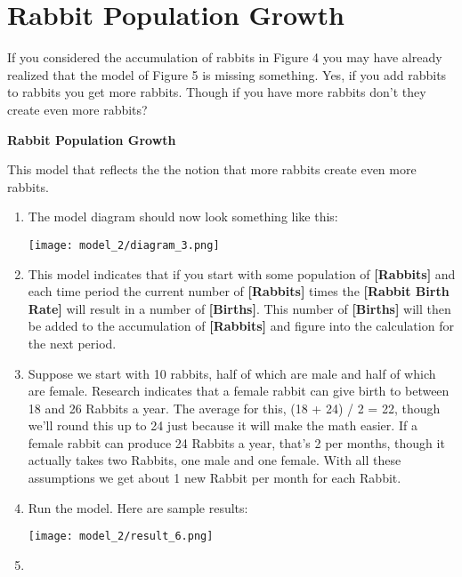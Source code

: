 \documentclass[]{memoir}
\makeatletter
\def\maxwidth{\ifdim\Gin@nat@width>\linewidth\linewidth
\else\Gin@nat@width\fi}
\let\Oldincludegraphics\includegraphics
\renewcommand{\includegraphics}[1]{\Oldincludegraphics[width=\maxwidth]{#1}}
\newcommand{\p}[1]{\textbf{{[}#1{]}}}
\makeatother
\begin{document}
\section{Rabbit Population Growth}

If you considered the accumulation of rabbits in Figure 4 you may have
already realized that the model of Figure 5 is missing something. Yes,
if you add rabbits to rabbits you get more rabbits. Though if you have
more rabbits don't they create even more rabbits?

\FloatBarrier 

\begin{oframed}\textbf{Rabbit Population Growth} 

 This model that reflects the the notion that more rabbits create even more rabbits.

\begin{enumerate}
\item The model diagram should now look something like this: \par \begin{minipage}{\linewidth}  \centering \texttt{[image: model\_2/diagram\_3.png]}
\end{minipage}
\item 

This model indicates that if you start with some population of \p{Rabbits} and each time period the current number of \p{Rabbits} times the \p{Rabbit Birth Rate} will result in a number of \p{Births}. This number of \p{Births} will then be added to the accumulation of \p{Rabbits} and figure into the calculation for the next period.


\item 

Suppose we start with 10 rabbits, half of which are male and half of which are female. Research indicates that a female rabbit can give birth to between 18 and 26 Rabbits a year. The average for this, (18 + 24) / 2 = 22, though we'll round this up to 24 just because it will make the math easier. If a female rabbit can produce 24 Rabbits a year, that's 2 per months, though it actually takes two Rabbits, one male and one female. With all these assumptions we get about 1 new Rabbit per month for each Rabbit.


\item Run the model. Here are sample results:\par \begin{minipage}{\linewidth}  \centering \texttt{[image: model\_2/result\_6.png]}
\end{minipage}
\item 


\end{enumerate}
\end{oframed}
\end{document}

